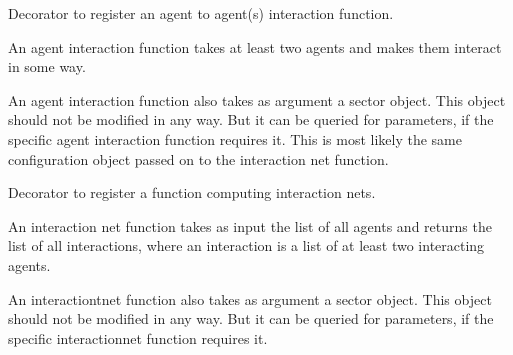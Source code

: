 \documentclass[letterpaper,10pt,english]{sphinxmanual}
\begin{document}

\begin{fulllineitems}
\label{\detokenize{api:muse.interactions.register_agent_interaction}}
Decorator to register an agent to agent(s) interaction function.

An agent interaction function takes at least two agents and makes them
interact in some way.

An agent interaction function also takes as argument a sector object.
This object should not be modified in any way. But it can be queried for
parameters, if the specific agent interaction function requires it. This is
most likely the same configuration object passed on to the interaction net
function.

\end{fulllineitems}


\begin{fulllineitems}
\label{\detokenize{api:muse.interactions.register_interaction_net}}
Decorator to register a function computing interaction nets.

An interaction net function takes as input the list of all agents and
returns the list of all interactions, where an interaction is a list of at
least two interacting agents.

An interactiont\sphinxhyphen{}net function also takes as argument a sector object.
This object should not be modified in any way. But it can be queried for
parameters, if the specific interaction\sphinxhyphen{}net function requires it.

\end{fulllineitems}
\end{document}
